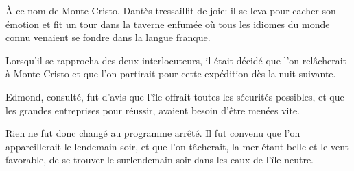 À ce nom de Monte-Cristo, Dantès tressaillit de joie: il se leva pour cacher son émotion et fit un tour dans la taverne enfumée où tous les idiomes du monde connu venaient se fondre dans la langue franque.

Lorsqu'il se rapprocha des deux interlocuteurs, il était décidé que l'on relâcherait à Monte-Cristo et que l'on partirait pour cette expédition dès la nuit suivante.

Edmond, consulté, fut d'avis que l'île offrait toutes les sécurités possibles, et que les grandes entreprises pour réussir, avaient besoin d'être menées vite.

Rien ne fut donc changé au programme arrêté. Il fut convenu que l'on appareillerait le lendemain soir, et que l'on tâcherait, la mer étant belle et le vent favorable, de se trouver le surlendemain soir dans les eaux de l'île neutre.



